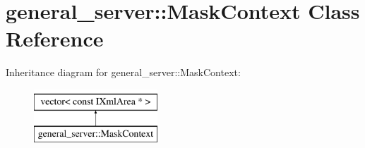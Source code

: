 \hypertarget{classgeneral__server_1_1MaskContext}{\section{general\-\_\-server\-:\-:\-Mask\-Context \-Class \-Reference}
\label{classgeneral__server_1_1MaskContext}
}
\-Inheritance diagram for general\-\_\-server\-:\-:\-Mask\-Context\-:\begin{figure}[H]
\begin{center}
\leavevmode
\includegraphics[height=2.000000cm]{classgeneral__server_1_1MaskContext}
\end{center}
\end{figure}
